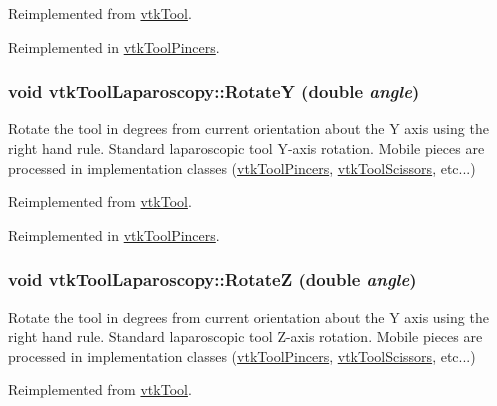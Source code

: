 Reimplemented from \hyperlink{classvtkTool_a34b408444b681853b5dabbda6b971223}{vtkTool}.

Reimplemented in \hyperlink{classvtkToolPincers_ac6b80a0c7a43ae67cfafbe29772b41d0}{vtkToolPincers}.\hypertarget{classvtkToolLaparoscopy_ae0245eaa9aa765a675da5135c4af422a}{
\subsubsection[{RotateY}]{\setlength{\rightskip}{0pt plus 5cm}void vtkToolLaparoscopy::RotateY (double {\em angle})}}
\label{classvtkToolLaparoscopy_ae0245eaa9aa765a675da5135c4af422a}


Rotate the tool in degrees from current orientation about the Y axis using the right hand rule. Standard laparoscopic tool Y-\/axis rotation. Mobile pieces are processed in implementation classes (\hyperlink{classvtkToolPincers}{vtkToolPincers}, \hyperlink{classvtkToolScissors}{vtkToolScissors}, etc...) 

Reimplemented from \hyperlink{classvtkTool_ad37e6208805e0fddd07dfc783a70fceb}{vtkTool}.

Reimplemented in \hyperlink{classvtkToolPincers_aa2a15405aa65c96dd971e3c06d98d197}{vtkToolPincers}.\hypertarget{classvtkToolLaparoscopy_a3849ce4caa8283696433cb1ac0466bc5}{
\subsubsection[{RotateZ}]{\setlength{\rightskip}{0pt plus 5cm}void vtkToolLaparoscopy::RotateZ (double {\em angle})}}
\label{classvtkToolLaparoscopy_a3849ce4caa8283696433cb1ac0466bc5}


Rotate the tool in degrees from current orientation about the Y axis using the right hand rule. Standard laparoscopic tool Z-\/axis rotation. Mobile pieces are processed in implementation classes (\hyperlink{classvtkToolPincers}{vtkToolPincers}, \hyperlink{classvtkToolScissors}{vtkToolScissors}, etc...) 

Reimplemented from \hyperlink{classvtkTool_a80c0ca1937ce97c98d70364cac281ff2}{vtkTool}.

